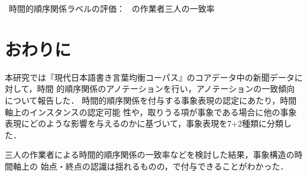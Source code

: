 \documentclass[japanese]{jnlp_1.4}
\newcommand{\modified}[1]{}
\def\tlink{}
\def\event{}
\def\klass{}
\begin{document}
\begin{table}[t]
\caption{\tlink\ 時間的順序関係ラベルの評価： \event\klass\ \modified{ごと}の作業者三人の一致率 }
\label{result:classagreement}

\end{table}

\modified{最後に意味論アノテーションにおける正解のあり方について言及する．
テキストが表出する意味レベルの情報の正解は，言語受容者によって完全に復元
することは困難であり，100\% 正しいものを作成するためには言語生産者によるアノテー
ション作業が不可欠である．
言語生産者によるアノテーション作業を BCCWJ に対して行うことは困難であるため，
本研究では作業者三人の結果を統合した形での正解は作成しない．
言語受容者の個人の心的空間における時間的順序関係の認識は
それぞれ異なっていてしかるべきであり，受容者\modified{ごと}に正解があると考える．}

\modified{個々の言語受容者の作業結果の正誤判定として，それぞれのアノテーション内
での無矛盾性の認定が考えられる．
Allen の二次の範囲代数を，三次以上に拡張すると人の処理能力を超え，機械的に処理す
るにも適切な演算が必要になるため，今後の課題とする
\footnote{Allen の範囲代数を拡張すると，三次で409クラス，四次で23,917クラス，五次で2,244,361クラスになることが知られている．}．}

\modified{このアノテーションに基づき解析器の構成を行う場合には何らかの正解を決め
る必要がある．正解の設定として，一人の作業者のアノテーションを正解とする方法，三
人の作業者が一致している部分を正解とする方法，三人の作業者それぞれの学習モデルを
作成し多数決を取る方法などの様々な方法が考えられる．高性能な構造学習器を構成する
ためにどのように正解を認めるかについては，工学研究者に委ねたい．}


\section{おわりに}
\label{sec:conclusion}

本研究では『現代日本語書き言葉均衡コーパス』のコアデータ中の新聞データに対して，時間
的順序関係のアノテーションを行い，アノテーションの一致傾向について報告した．
時間的順序関係を付与する事象表現の認定にあたり，時間軸上のインスタンスの認定可能
性や，取りうる項が事象である場合に他の事象表現にどのような影響を与えるのかに基づいて，事象表現を7+2種類に分類した．

\modified{次に，}三人の作業者による時間的順序関係の一致率などを検討した結果，事象構造の時間軸上の
始点・終点の認識は揺れるものの，\modified{時間軸上の前後関係は時間情報表現にまつわるもので 73\% 以上（ラベル5+1評価で DCT 74.8\%，T2E 73.4\%），事象表現にまつわるもので 62\% 以上（ラベル5+1評価で E2E 62.7\%，MATRIX 62.3\%）の一致率}で付与できることがわかった．
\end{document}
